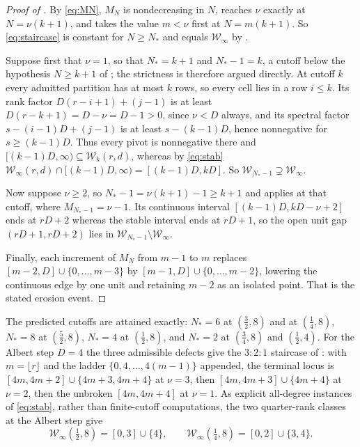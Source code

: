 \documentclass[11pt,letterpaper]{article}
\begin{document}
\begin{proof}[Proof of ]
By \eqref{eq:MN}, $M_N$ is nondecreasing in $N$, reaches $\nu$ exactly at
$N=\nu(k+1)$, and takes the value $m<\nu$ first at $N=m(k+1)$. So
\eqref{eq:staircase} is constant for $N\ge N_*$ and equals $\mathcal{W}_\infty$
by .

Suppose first that $\nu=1$, so that $N_*=k+1$ and $N_*-1=k$, a cutoff below the
hypothesis $N\ge k+1$ of ; the strictness is therefore argued
directly. At cutoff $k$ every admitted partition has at most $k$ rows, so every
cell lies in a row $i\le k$. Its rank factor $D(r-i+1)+(j-1)$ is at least
$D(r-k+1)=D-\nu=D-1>0$, since $\nu<D$ always, and its spectral factor
$s-(i-1)D+(j-1)$ is at least $s-(k-1)D$, hence nonnegative for
$s\ge(k-1)D$. Thus every pivot is nonnegative there and
$[(k-1)D,\infty)\subseteq\mathcal{W}_k(r,d)$, whereas by \eqref{eq:stab}
$\mathcal{W}_\infty(r,d)\cap[(k-1)D,\infty)=[(k-1)D,kD]$. So
$\mathcal{W}_{N_*-1}\supsetneq\mathcal{W}_\infty$.

Now suppose $\nu\ge2$, so $N_*-1=\nu(k+1)-1\ge k+1$ and 
applies at that cutoff, where $M_{N_*-1}=\nu-1$. Its continuous interval
$[(k-1)D,kD-\nu+2]$ ends at $rD+2$ whereas the stable interval ends at $rD+1$, so
the open unit gap $(rD+1,rD+2)$ lies in
$\mathcal{W}_{N_*-1}\setminus\mathcal{W}_\infty$.

Finally, each increment of $M_N$ from $m-1$ to $m$ replaces
$[m-2,D]\cup\{0,\dots,m-3\}$ by $[m-1,D]\cup\{0,\dots,m-2\}$, lowering the
continuous edge by one unit and retaining $m-2$ as an isolated point. That is the
stated erosion event.
\end{proof}

The predicted cutoffs are attained exactly: $N_*=6$ at $(\tfrac32,8)$ and at
$(\tfrac14,8)$, $N_*=8$ at $(\tfrac52,8)$, $N_*=4$ at $(\tfrac12,8)$, and $N_*=2$
at $(\tfrac34,8)$ and $(\tfrac12,4)$. For the Albert step $D=4$ the three
admissible defects give the $3:2:1$ staircase of : with
$m=\lfloor r\rfloor$ and the ladder $\{0,4,\dots,4(m-1)\}$ appended, the terminal
locus is $[4m,4m+2]\cup\{4m+3,4m+4\}$ at $\nu=3$, then $[4m,4m+3]\cup\{4m+4\}$ at
$\nu=2$, then the unbroken $[4m,4m+4]$ at $\nu=1$. As explicit all-degree
instances of \eqref{eq:stab}, rather than finite-cutoff computations, the two
quarter-rank classes at the Albert step give
\begin{equation}
  \mathcal{W}_\infty\!\left(\tfrac12,8\right)=[0,3]\cup\{4\},
  \qquad
  \mathcal{W}_\infty\!\left(\tfrac14,8\right)=[0,2]\cup\{3,4\}.
  \label{eq:half8}
\end{equation}
\end{document}
